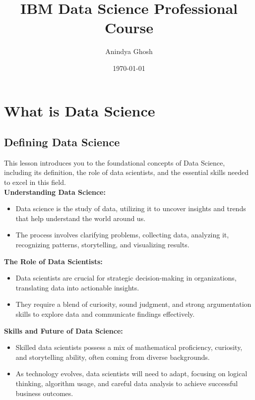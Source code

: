 \documentclass[12pt]{report} %
\begin{document}
	
	\title{IBM Data Science Professional Course}
	\author{Anindya Ghosh}
	\date{\today}
	\maketitle
	
	\tableofcontents %
	
	\chapter{What is Data Science}
	
	\section{Defining Data Science}
	
	This lesson introduces you to the foundational concepts of Data Science, including its definition, the role of data scientists, and the essential skills needed to excel in this field.\\
	

	\noindent \textbf{Understanding Data Science:}
	\begin{itemize}
		\item Data science is the study of data, utilizing it to uncover insights and trends that help understand the world around us.
		\item The process involves clarifying problems, collecting data, analyzing it, recognizing patterns, storytelling, and visualizing results.
	\end{itemize}
	
	\noindent \textbf{The Role of Data Scientists:}
	\begin{itemize}
		\item Data scientists are crucial for strategic decision-making in organizations, translating data into actionable insights.
		\item They require a blend of curiosity, sound judgment, and strong argumentation skills to explore data and communicate findings effectively.
	\end{itemize}
	
	\noindent \textbf{Skills and Future of Data Science:}
	\begin{itemize}
		\item Skilled data scientists possess a mix of mathematical proficiency, curiosity, and storytelling ability, often coming from diverse backgrounds.
		\item As technology evolves, data scientists will need to adapt, focusing on logical thinking, algorithm usage, and careful data analysis to achieve successful business outcomes.
	\end{itemize}
	
\end{document}

